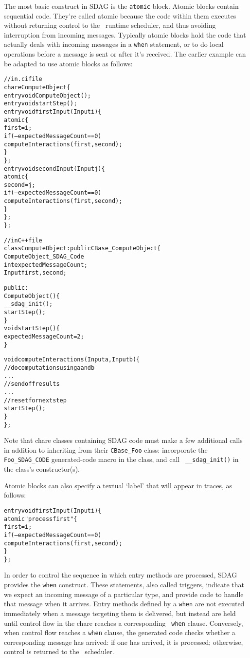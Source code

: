 The most basic construct in SDAG is the {\tt atomic} block. Atomic blocks
contain sequential \CC code.  They're called atomic because the code within
them executes without returning control to the \charmpp\ runtime scheduler, and
thus avoiding interruption from incoming messages. Typically atomic blocks hold
the code that actually deals with incoming messages in a {\tt when} statement,
or to do local operations before a message is sent or after it's received. The
earlier example can be adapted to use atomic blocks as follows:
\begin{center}
\begin{alltt}
// in .ci file
chare ComputeObject \{
  entry void ComputeObject();
  entry void startStep();
  entry void firstInput(Input i) \{
    atomic \{
      first = i;
      if (--expectedMessageCount == 0)
        computeInteractions(first, second);
    \}
  \};
  entry void secondInput(Input j) \{
    atomic \{
      second = j;
      if (--expectedMessageCount == 0)
        computeInteractions(first, second);
    \}
  \};
\};

// in C++ file
class ComputeObject : public CBase\_ComputeObject \{
  ComputeObject\_SDAG\_Code
  int   expectedMessageCount;
  Input first, second;

public:
  ComputeObject() \{
    __sdag_init();
    startStep();
  \}
  void startStep() \{
    expectedMessageCount = 2;
  \}

  void computeInteractions(Input a, Input b) \{
    // do computations using a and b
    . . .
    // send off results
    . . .
    // reset for next step
    startStep();
  \}
\};
\end{alltt}
\end{center}
Note that chare classes containing SDAG code must make a few additional calls
in addition to inheriting from their {\tt CBase\_Foo} class: incorporate the
{\tt Foo\_SDAG\_CODE} generated-code macro in the class, and call {\tt
  \_\_sdag\_init()} in the class's constructor(s).

Atomic blocks can also specify a textual `label' that will appear in traces, as
follows:
\begin{center}
\begin{alltt}
  entry void firstInput(Input i) \{
    atomic "process first" \{
      first = i;
      if (--expectedMessageCount == 0)
        computeInteractions(first, second);
    \}
  \};
\end{alltt}
\end{center}

In order to control the sequence in which entry methods are processed, SDAG
provides the {\tt when} construct. These statements, also called triggers,
indicate that we expect an incoming message of a particular type, and provide
code to handle that message when it arrives.
Entry methods defined by a {\tt when} are
not executed immediately when a message tergeting them is delivered, but
instead are held until control flow in the chare reaches a corresponding {\tt
  when} clause. Conversely, when control flow reaches a {\tt when} clause, the
generated code checks whether a corresponding message has arrived: if one has
arrived, it is processed; otherwise, control is returned to the
\charmpp\ scheduler. 

